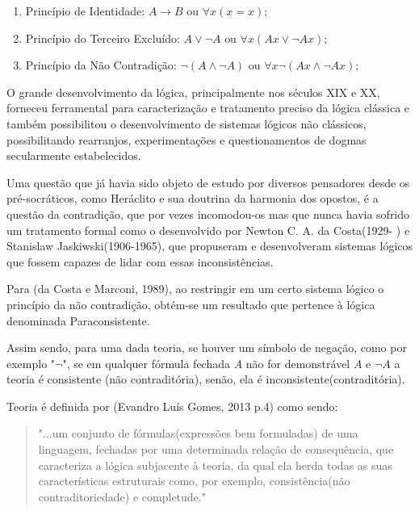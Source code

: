 \begin{enumerate}
\item Princípio de Identidade: 
    \begin{math}
	A \rightarrow B 
	\textrm{ ou } 
	\forall x(x=x);
    \end{math}

\item Princípio do Terceiro Excluído:
    \begin{math}
	A \vee \neg A
	\textrm{ ou }
	\forall x(Ax \vee \neg Ax);
    \end{math}

\item Princípio da Não Contradição: 
    \begin{math}
	\neg (A \wedge \neg A)
	\textrm{ ou }
	\forall x\neg(Ax \wedge \neg Ax);
    \end{math}

\end{enumerate}

O grande desenvolvimento da lógica, principalmente nos séculos XIX e XX, forneceu ferramental para caracterização e tratamento preciso da lógica clássica e também possibilitou o desenvolvimento de sistemas lógicos não clássicos, possibilitando rearranjos, experimentações e questionamentos de dogmas secularmente estabelecidos.

Uma questão que já havia sido objeto de estudo por diversos pensadores desde os pré-socráticos, como Heráclito e sua doutrina da harmonia dos opostos, é a questão da contradição, que por vezes incomodou-os mas que nunca havia sofrido um tratamento formal como o desenvolvido por Newton C. A. da Costa(1929- ) e Stanislaw Jaskiwski(1906-1965), que propuseram e desenvolveram sistemas lógicos que fossem capazes de lidar com essas inconsistências. 

Para (da Costa e Marconi, 1989), ao restringir em um certo sistema lógico o princípio da não contradição, obtém-se um resultado que pertence à lógica denominada Paraconsistente.


Assim sendo, para uma dada teoria, se houver um símbolo de negação, como por exemplo "\emph{$\neg $}", se em qualquer fórmula fechada \emph{A} não for demonstrável \emph{$A$} e \emph{$\neg A $} a teoria é consistente (não contraditória), senão, ela é inconsistente(contraditória).


Teoria é definida por (Evandro Luís Gomes, 2013 p.4) como sendo:
\begin{quote}
"...um conjunto de fórmulas(expressões bem formuladas) de uma linguagem, fechadas por uma determinada relação de consequência, que caracteriza a lógica subjacente à teoria, da qual ela herda todas as suas características estruturais como, por exemplo, consistência(não contraditoriedade) e completude." 
\end{quote}

